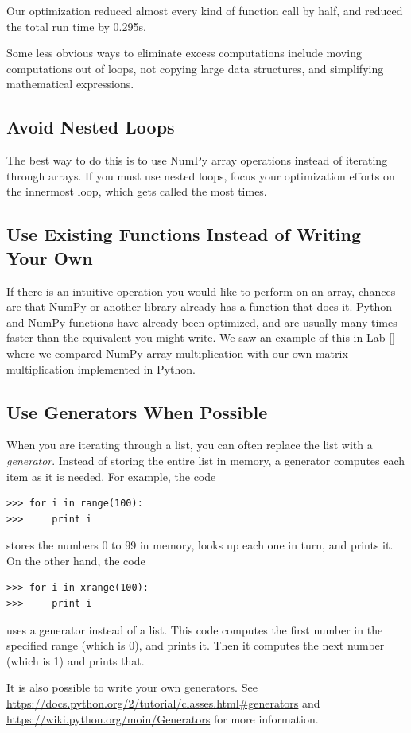Our optimization reduced almost every kind of function call by half, and reduced the total run time by 0.295s.

Some less obvious ways to eliminate excess computations include moving computations out of loops, not copying large data structures, and simplifying mathematical expressions.


\subsection*{Avoid Nested Loops}
The best way to do this is to use NumPy array operations instead of iterating through arrays.
If you must use nested loops, focus your optimization efforts on the innermost loop, which gets called the most times.

\subsection*{Use Existing Functions Instead of Writing Your Own}
If there is an intuitive operation you would like to perform on an array, chances are that NumPy or another library already has a function that does it.
Python and NumPy functions have already been optimized, and are usually many times faster than the equivalent you might write.
We saw an example of this in Lab \ref{} where we compared NumPy array multiplication with our own matrix multiplication implemented in Python.

\subsection*{Use Generators When Possible}
When you are iterating through a list, you can often replace the list with a \emph{generator}.
Instead of storing the entire list in memory, a generator computes each item as it is needed. 
For example, the code
\begin{lstlisting}
>>> for i in range(100):
>>>     print i
\end{lstlisting}
stores the numbers 0 to 99 in memory, looks up each one in turn, and prints it. 
On the other hand, the code
\begin{lstlisting}
>>> for i in xrange(100):
>>>     print i
\end{lstlisting}
uses a generator instead of a list. 
This code computes the first number in the specified range (which is 0), and prints it.
Then it computes the next number (which is 1) and prints that.

It is also possible to write your own generators. 
See \url{https://docs.python.org/2/tutorial/classes.html#generators} and \url{https://wiki.python.org/moin/Generators} for more information.

